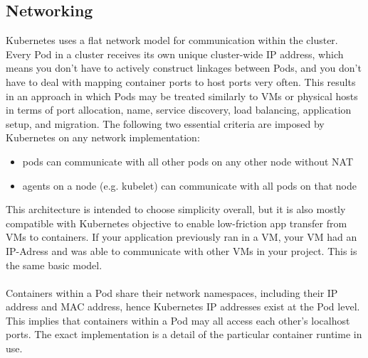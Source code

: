 \subsection{Networking}
Kubernetes uses a flat network model for communication within the cluster. Every Pod in a cluster receives its own unique cluster-wide IP address, which means you don't have to actively construct linkages between Pods, and you don't have to deal with mapping container ports to host ports very often. This results in an approach in which Pods may be treated similarly to VMs or physical hosts in terms of port allocation, name, service discovery, load balancing, application setup, and migration. The following two essential criteria are imposed by Kubernetes on any network implementation: 
\begin{itemize}
    \item pods can communicate with all other pods on any other node without NAT
    \item agents on a node (e.g. kubelet) can communicate with all pods on that node
\end{itemize}

\noindent This architecture is intended to choose simplicity overall, but it is also mostly compatible with Kubernetes objective to enable low-friction app transfer from VMs to containers. If your application previously ran in a VM, your VM had an IP-Adress and was able to communicate with other VMs in your project. This is the same basic model.
\\\\Containers within a Pod share their network namespaces, including their IP address and MAC address, hence Kubernetes IP addresses exist at the Pod level. This implies that containers within a Pod may all access each other's localhost ports. The exact implementation is a detail of the particular container runtime in use.\cite{Kubernetes_network:2022}